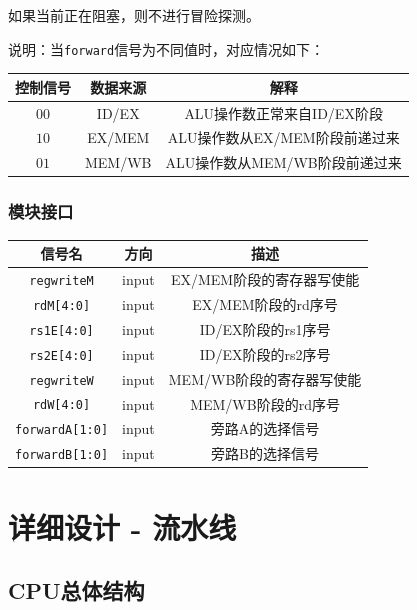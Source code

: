 \documentclass[UTF8,a4paper,autofakebold,15pt]{ctexart}
\begin{document}
如果当前正在阻塞，则不进行冒险探测。

说明：当{\tt forward}信号为不同值时，对应情况如下\cite{ref1}：

\begin{center}
	\begin{tabular}{|c|c|c|}
		\hline
		控制信号&数据来源&解释\\
		\hline
		$00$&ID/EX&ALU操作数正常来自ID/EX阶段\\
		\hline
		$10$&EX/MEM&ALU操作数从EX/MEM阶段前递过来\\
		\hline
		$01$&MEM/WB&ALU操作数从MEM/WB阶段前递过来\\
		\hline
	\end{tabular}
\end{center}

\subsubsection{模块接口}

\begin{center}
	\begin{tabular}{|c|c|c|}
		\hline
		信号名&方向&描述\\
		\hline
		{\tt regwriteM}&input&EX/MEM阶段的寄存器写使能\\
		\hline
		{\tt rdM[4:0]}&input&EX/MEM阶段的rd序号\\
		\hline
		{\tt rs1E[4:0]}&input&ID/EX阶段的rs1序号\\
		\hline
		{\tt rs2E[4:0]}&input&ID/EX阶段的rs2序号\\
		\hline
		{\tt regwriteW}&input&MEM/WB阶段的寄存器写使能\\
		\hline
		{\tt rdW[4:0]}&input&MEM/WB阶段的rd序号\\
		\hline
		{\tt forwardA[1:0]}&input&旁路A的选择信号\\
		\hline
		{\tt forwardB[1:0]}&input&旁路B的选择信号\\
		\hline
	\end{tabular}
\end{center}

\newpage

\section{详细设计 - 流水线}

\subsection{CPU总体结构}
\end{document}
